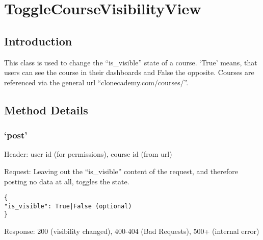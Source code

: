 \chapter*{ToggleCourseVisibilityView}

\section*{Introduction}\label{introduction}

This class is used to change the ``is\_visible'' state of a course.
`True' means, that users can see the course in their dashboards and
False the opposite. Courses are referenced via the general url
``clonecademy.com/courses/''.

\section*{Method Details}\label{method-details}

\subsection*{\texorpdfstring{`post'}{post}}\label{post}

Header: user id (for permissions), course id (from url)

Request: Leaving out the ``is\_visible'' content of the request, and
therefore posting no data at all, toggles the state.

\begin{verbatim}
{
"is_visible": True|False (optional)  
}
\end{verbatim}

Response: 200 (visibility changed), 400-404 (Bad Requests), 500+
(internal error)
